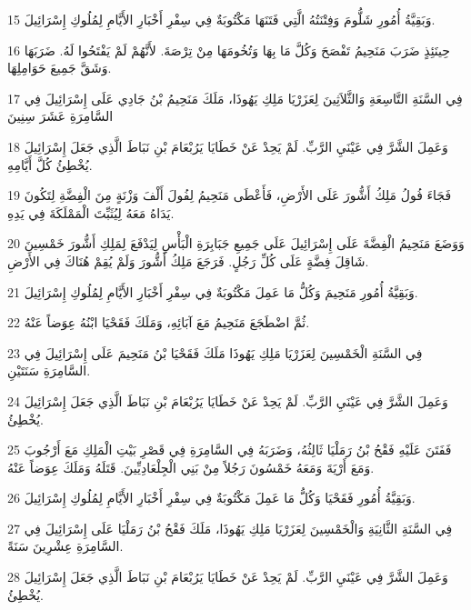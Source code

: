 \par 15 وَبَقِيَّةُ أُمُورِ شَلُّومَ وَفِتْنَتُهُ الَّتِي فَتَنَهَا مَكْتُوبَةٌ فِي سِفْرِ أَخْبَارِ الأَيَّامِ لِمُلُوكِ إِسْرَائِيلَ.
\par 16 حِينَئِذٍ ضَرَبَ مَنَحِيمُ تَفْصَحَ وَكُلَّ مَا بِهَا وَتُخُومَهَا مِنْ تِرْصَةَ. لأَنَّهُمْ لَمْ يَفْتَحُوا لَهُ. ضَرَبَهَا وَشَقَّ جَمِيعَ حَوَامِلِهَا.
\par 17 فِي السَّنَةِ التَّاسِعَةِ وَالثَّلاَثِينَ لِعَزَرْيَا مَلِكِ يَهُوذَا، مَلَكَ مَنَحِيمُ بْنُ جَادِي عَلَى إِسْرَائِيلَ فِي السَّامِرَةِ عَشَرَ سِنِينَ
\par 18 وَعَمِلَ الشَّرَّ فِي عَيْنَيِ الرَّبِّ. لَمْ يَحِدْ عَنْ خَطَايَا يَرُبْعَامَ بْنِ نَبَاطَ الَّذِي جَعَلَ إِسْرَائِيلَ يُخْطِئُ كُلَّ أَيَّامِهِ.
\par 19 فَجَاءَ فُولُ مَلِكُ أَشُّورَ عَلَى الأَرْضِ، فَأَعْطَى مَنَحِيمُ لِفُولَ أَلْفَ وَزْنَةٍ مِنَ الْفِضَّةِ لِتَكُونَ يَدَاهُ مَعَهُ لِيُثَبِّتَ الْمَمْلَكَةَ فِي يَدِهِ.
\par 20 وَوَضَعَ مَنَحِيمُ الْفِضَّةَ عَلَى إِسْرَائِيلَ عَلَى جَمِيعِ جَبَابِرَةِ الْبَأْسِ لِيَدْفَعَ لِمَلِكِ أَشُّورَ خَمْسِينَ شَاقِلَ فِضَّةٍ عَلَى كُلِّ رَجُلٍ. فَرَجَعَ مَلِكُ أَشُّورَ وَلَمْ يُقِمْ هُنَاكَ فِي الأَرْضِ.
\par 21 وَبَقِيَّةُ أُمُورِ مَنَحِيمَ وَكُلُّ مَا عَمِلَ مَكْتُوبَةٌ فِي سِفْرِ أَخْبَارِ الأَيَّامِ لِمُلُوكِ إِسْرَائِيلَ.
\par 22 ثُمَّ اضْطَجَعَ مَنَحِيمُ مَعَ آبَائِهِ، وَمَلَكَ فَقَحْيَا ابْنُهُ عِوَضاً عَنْهُ.
\par 23 فِي السَّنَةِ الْخَمْسِينَ لِعَزَرْيَا مَلِكِ يَهُوذَا مَلَكَ فَقَحْيَا بْنُ مَنَحِيمَ عَلَى إِسْرَائِيلَ فِي السَّامِرَةِ سَنَتَيْنِ.
\par 24 وَعَمِلَ الشَّرَّ فِي عَيْنَيِ الرَّبِّ. لَمْ يَحِدْ عَنْ خَطَايَا يَرُبْعَامَ بْنِ نَبَاطَ الَّذِي جَعَلَ إِسْرَائِيلَ يُخْطِئُ.
\par 25 فَفَتَنَ عَلَيْهِ فَقْحُ بْنُ رَمَلْيَا ثَالِثُهُ، وَضَرَبَهُ فِي السَّامِرَةِ فِي قَصْرِ بَيْتِ الْمَلِكِ مَعَ أَرْجُوبَ وَمَعَ أَرْيَةَ وَمَعَهُ خَمْسُونَ رَجُلاً مِنْ بَنِي الْجِلْعَادِيِّينَ. قَتَلَهُ وَمَلَكَ عِوَضاً عَنْهُ.
\par 26 وَبَقِيَّةُ أُمُورِ فَقَحْيَا وَكُلُّ مَا عَمِلَ مَكْتُوبَةٌ فِي سِفْرِ أَخْبَارِ الأَيَّامِ لِمُلُوكِ إِسْرَائِيلَ.
\par 27 فِي السَّنَةِ الثَّانِيَةِ وَالْخَمْسِينَ لِعَزَرْيَا مَلِكِ يَهُوذَا، مَلَكَ فَقْحُ بْنُ رَمَلْيَا عَلَى إِسْرَائِيلَ فِي السَّامِرَةِ عِشْرِينَ سَنَةً.
\par 28 وَعَمِلَ الشَّرَّ فِي عَيْنَيِ الرَّبِّ. لَمْ يَحِدْ عَنْ خَطَايَا يَرُبْعَامَ بْنِ نَبَاطَ الَّذِي جَعَلَ إِسْرَائِيلَ يُخْطِئُ.
